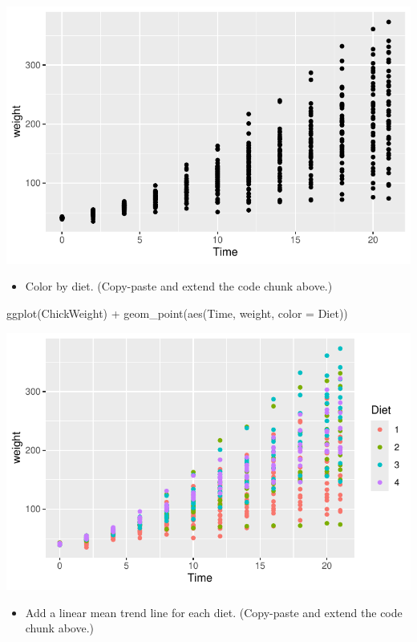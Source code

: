 \documentclass[
  letterpaper,
  DIV=11,
  numbers=noendperiod]{scrartcl}
\newenvironment{Shaded}{\begin{snugshade}}{\end{snugshade}}
\newcommand{\AttributeTok}[1]{\textcolor[rgb]{0.40,0.45,0.13}{#1}}
\newcommand{\FunctionTok}[1]{\textcolor[rgb]{0.28,0.35,0.67}{#1}}
\newcommand{\NormalTok}[1]{\textcolor[rgb]{0.00,0.23,0.31}{#1}}
\newcommand{\SpecialCharTok}[1]{\textcolor[rgb]{0.37,0.37,0.37}{#1}}
\providecommand{\tightlist}{%
  \setlength{\itemsep}{0pt}\setlength{\parskip}{0pt}}\usepackage{longtable,booktabs,array}
\begin{document}
\includegraphics{5-ggplot2_kevin_files/figure-pdf/unnamed-chunk-11-1.pdf}

\begin{itemize}
\tightlist
\item
  Color by diet. (Copy-paste and extend the code chunk above.)
\end{itemize}

\begin{Shaded}
\begin{Highlighting}[]
\FunctionTok{ggplot}\NormalTok{(ChickWeight) }\SpecialCharTok{+}
  \FunctionTok{geom\_point}\NormalTok{(}\FunctionTok{aes}\NormalTok{(Time, weight, }\AttributeTok{color =}\NormalTok{ Diet))}
\end{Highlighting}
\end{Shaded}

\includegraphics{5-ggplot2_kevin_files/figure-pdf/unnamed-chunk-12-1.pdf}

\begin{itemize}
\tightlist
\item
  Add a linear mean trend line for each diet. (Copy-paste and extend the
  code chunk above.)
\end{itemize}
\end{document}
